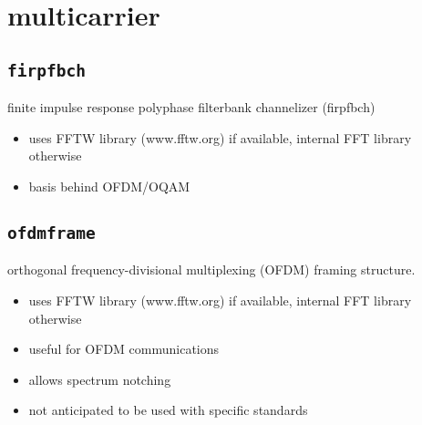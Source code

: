 %
%

\newpage
\section{multicarrier}
\label{module:multicarrier}

\subsection{{\tt firpfbch}}
\label{module:multicarrier:firpfbch}
finite impulse response polyphase filterbank channelizer (firpfbch)
\begin{itemize}
\item uses FFTW library (www.fftw.org) if available, internal FFT library
      otherwise
\item basis behind OFDM/OQAM
\end{itemize}


\subsection{{\tt ofdmframe}}
\label{module:multicarrier:ofdmframe}
orthogonal frequency-divisional multiplexing (OFDM) framing structure.
\begin{itemize}
\item uses FFTW library (www.fftw.org) if available, internal FFT library
      otherwise
\item useful for OFDM communications
\item allows spectrum notching
\item not anticipated to be used with specific standards
\end{itemize}



